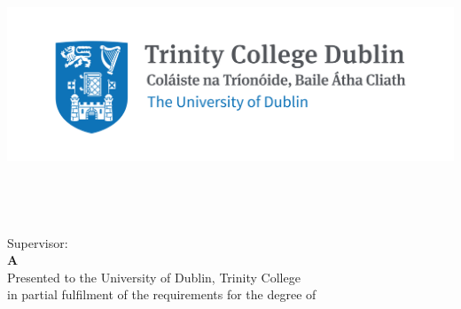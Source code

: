 \begin{titlepage}

\center %



\includegraphics{title/Trinity_RGB_transparent_main.png}\\[1cm] 

\Large \school\\[1.5cm] %
\ifdefined\department
\large \department\\[1.5cm] %
\fi
\large
\makeatletter
{ \Large \bfseries \thesistitle}\\[1.5cm] %
 


\authorname\\[.5cm] %
Supervisor: \supervisor\\[2cm]

{ \large \bfseries A \typeofthesis } \\
Presented to the University of Dublin, Trinity College \\
in partial fulfilment of the requirements for the degree of \\
{ \large \bfseries \degree } \\[2cm]


\end{titlepage}
